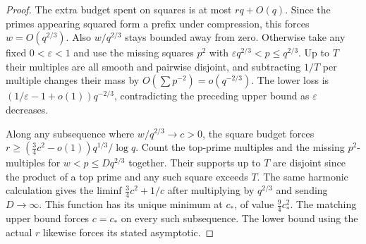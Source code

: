 \begin{proof}
The extra budget spent on squares is at most $rq+O(q)$. Since the primes appearing squared form a prefix under compression, this forces $w=O(q^{2/3})$. Also $w/q^{2/3}$ stays bounded away from zero. Otherwise take any fixed $0<\varepsilon<1$ and use the missing squares $p^2$ with $\varepsilon q^{2/3}<p\le q^{2/3}$. Up to $T$ their multiples are all smooth and pairwise disjoint, and subtracting $1/T$ per multiple changes their mass by $O(\sum p^{-2})=o(q^{-2/3})$. The lower loss is $(1/\varepsilon-1+o(1))q^{-2/3}$, contradicting the preceding upper bound as $\varepsilon$ decreases.

Along any subsequence where $w/q^{2/3}\to c>0$, the square budget forces $r\ge(\tfrac34 c^2-o(1))q^{1/3}/\log q$. Count the top-prime multiples and the missing $p^2$-multiples for $w<p\le Dq^{2/3}$ together. Their supports up to $T$ are disjoint since the product of a top prime and any such square exceeds $T$. The same harmonic calculation gives the liminf $\tfrac34c^2+1/c$ after multiplying by $q^{2/3}$ and sending $D\to\infty$. This function has its unique minimum at $c_*$, of value $\tfrac94c_*^2$. The matching upper bound forces $c=c_*$ on every such subsequence. The lower bound using the actual $r$ likewise forces its stated asymptotic.
\end{proof}
